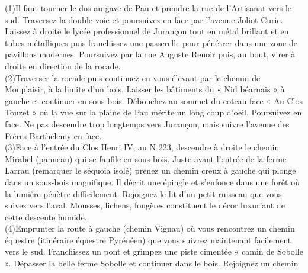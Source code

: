 \documentclass{article}
\begin{document}
        (1)\indent Il faut tourner le dos au gave de Pau et prendre la rue
                                de l'Artisanat vers le sud. Traversez la double-voie et poursuivez
                                en face par l'avenue Joliot-Curie. Laissez à droite le lycée
                                professionnel de Jurançon tout en métal brillant et en tubes
                                métalliques puis franchissez une passerelle pour pénétrer dans une
                                zone de pavillons modernes. Poursuivez par la rue Auguste Renoir
                                puis, au bout, virer à droite en direction de la rocade.
                            \\(2)\indent Traverser la rocade puis continuez en vous élevant par
                                le chemin de Monplaisir, à la limite d'un bois. Laisser les
                                bâtiments du « Nid béarnais » à gauche et continuer en sous-bois.
                                Débouchez au sommet du coteau face « Au Clos Touzet » où la vue sur
                                la plaine de Pau mérite un long coup d'oeil. Poursuivez en face. Ne
                                pas descendre trop longtemps vers Jurançon, mais suivre l'avenue des
                                Frères Barthélemy en face. \\(3)\indent Face à l'entrée du Clos Henri IV, au N 223, descendre à
                                droite le chemin Mirabel (panneau) qui se faufile en sous-bois.
                                Juste avant l'entrée de la ferme Larrau (remarquer le séquoia isolé)
                                prenez un chemin creux à gauche qui plonge dans un sous-bois
                                magnifique. Il décrit une épingle et s'enfonce dans une forêt où la
                                lumière pénètre difficilement. Rejoignez le lit d'un petit ruisseau
                                que vous suivez vers l'aval. Mousses, lichens, fougères constituent
                                le décor luxuriant de cette descente humide. \\(4)\indent Emprunter la route à gauche (chemin Vignau) où vous
                                rencontrez un chemin équestre (itinéraire équestre Pyrénéen) que
                                vous suivrez maintenant facilement vers le sud. Franchissez un pont
                                et grimpez une piste cimentée « camin de Sobolle ». Dépasser la
                                belle ferme Sobolle et continuer dans le bois. Rejoignez un chemin
\end{document}
